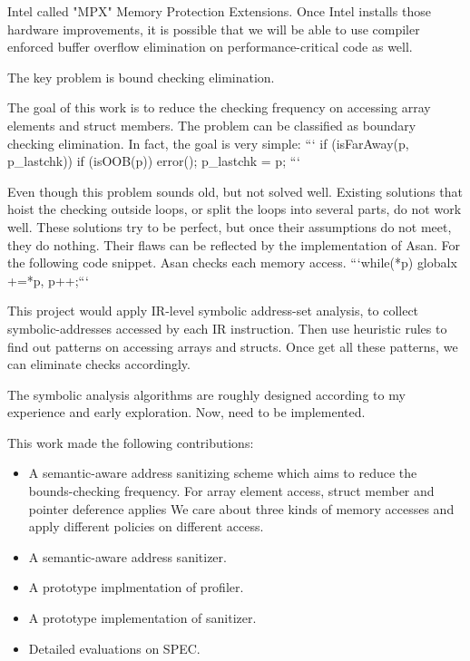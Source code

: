 Intel called "MPX" Memory Protection Extensions. Once Intel installs those hardware improvements, it is possible that we will be able to use compiler enforced buffer overflow elimination on performance-critical code as well.

The key problem is bound checking elimination.


The goal of this work is to reduce the checking frequency on accessing array elements and struct members.
The problem can be classified as boundary checking elimination. In fact, the goal is very simple:
```
if (isFarAway(p, p_lastchk)) {
    if (isOOB(p)) error();
    p_lastchk = p;
  }
```

Even though this problem sounds old, but not solved well.
Existing solutions that hoist the checking outside loops, or split the loops into several parts, do not work well.
These solutions try to be perfect, but once their assumptions do not meet, they do nothing.
Their flaws can be reflected by the implementation of Asan.
For the following code snippet. Asan checks each memory access.
```while(*p) {globalx +=*p, p++;}```

This project would apply IR-level symbolic address-set analysis, to collect symbolic-addresses accessed by each IR instruction.
Then use heuristic rules to find out patterns on accessing arrays and structs.
Once get all these patterns, we can eliminate checks accordingly.

The symbolic analysis algorithms are roughly designed according to my experience and early exploration.
Now, need to be implemented.


This work made the following contributions:

\begin{itemize}
  \item A semantic-aware address sanitizing scheme which aims to reduce the bounds-checking frequency.  For array element access, struct member and pointer deference applies We care about three kinds of memory accesses and apply different policies on different access.
  \item A semantic-aware address sanitizer.
  \item A prototype implmentation of profiler.
  \item A prototype implementation of sanitizer.
  \item Detailed evaluations on SPEC.
\end{itemize}

